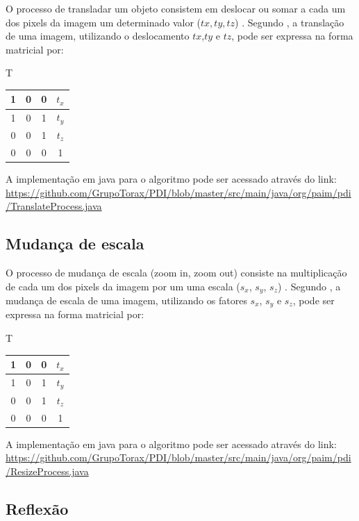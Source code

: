 \documentclass[
	12pt,				%
	oneside,			%
	a4paper,			%
	english,			%
	french,				%
	spanish,			%
	brazil,				%
	]{abntex2}
\begin{document}
O processo de transladar um objeto consistem em deslocar ou somar a cada um dos pixels da imagem um determinado valor (\(tx,ty,tz\)) \cite{conciAzevedoLeta:2008}. Segundo \citet{pedriniSchwartz:2008}, a translação de uma imagem, utilizando o deslocamento \(tx\),\(ty\) e \(tz\), pode ser expressa na forma matricial por:

T
\begin{tabular}{|c|c|c|c|}
	\hline
    1 & 0 & 0 & \(t_x\)   \\ \hline
	1 & 0 & 1 & \(t_y\)   \\ \hline   
	0 & 0 & 1 & \(t_z\)   \\ \hline   
	0 & 0 & 0 & 1        \\ \hline   
\end{tabular}

A implementação em java para o algoritmo pode ser acessado através do link:
\url{https://github.com/GrupoTorax/PDI/blob/master/src/main/java/org/paim/pdi/TranslateProcess.java}

\subsection{Mudança de escala}

O processo de mudança de escala (zoom in, zoom out) consiste na multiplicação de cada um dos pixels da imagem por um uma escala (\(s_x\), \(s_y\), \(s_z\))  \cite{conciAzevedoLeta:2008}. Segundo \citet{pedriniSchwartz:2008}, a mudança de escala de uma imagem, utilizando os fatores \(s_x\), \(s_y\) e \(s_z\), pode ser expressa na forma matricial por:

T
\begin{tabular}{|c|c|c|c|}
	\hline
    1 & 0 & 0 & \(t_x\)   \\ \hline
	1 & 0 & 1 & \(t_y\)   \\ \hline   
	0 & 0 & 1 & \(t_z\)   \\ \hline   
	0 & 0 & 0 & 1   \\ \hline   
\end{tabular}

A implementação em java para o algoritmo pode ser acessado através do link: \url{https://github.com/GrupoTorax/PDI/blob/master/src/main/java/org/paim/pdi/ResizeProcess.java}

\subsection{Reflexão}
\end{document}
